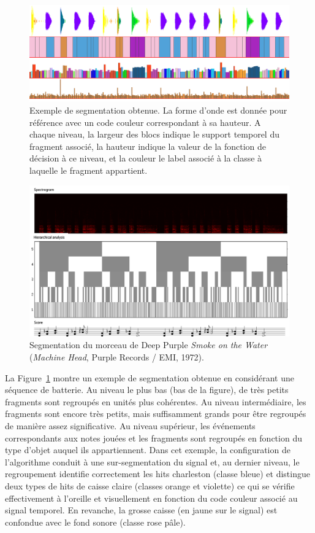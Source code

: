   \begin{figure}[t]
          \includegraphics[width=1.2\textwidth]{figures/alc_sample}
         \caption{Exemple de segmentation obtenue. La forme d'onde est donnée pour référence avec un code couleur correspondant à sa hauteur. A chaque niveau, la largeur des blocs indique le support temporel du fragment associé, la hauteur indique la valeur de la fonction de décision à ce niveau, et la couleur le label associé à la classe à laquelle le fragment appartient.}  \label{fig:alcéchantillon}
  \end{figure}

  \begin{figure}[t]
          \includegraphics[width=1.2\textwidth]{figures/smoke.png}
         \caption{Segmentation du morceau de Deep Purple \emph{Smoke on the Water} (\emph{Machine Head}, Purple Records / EMI, 1972).}  \label{fig:smoke}
  \end{figure}

La Figure~\ref{fig:alcéchantillon} montre un exemple de segmentation obtenue en considérant une séquence de batterie. Au niveau le plus bas (bas de la figure), de très petits fragments sont regroupés en unités plus cohérentes. Au niveau intermédiaire, les fragments sont encore très petits, mais suffisamment grands pour être regroupés de manière assez significative. Au niveau supérieur, les événements correspondants aux notes jouées et les fragments sont regroupés en fonction du type d'objet auquel ils appartiennent. Dans cet exemple, la configuration de l'algorithme conduit à une sur-segmentation du signal et, au dernier niveau, le regroupement identifie correctement les hits charleston (classe bleue) et distingue deux types de hits de caisse claire (classes orange et violette) ce qui se vérifie effectivement à l'oreille et visuellement en fonction du code couleur associé au signal temporel. En revanche, la grosse caisse (en jaune sur le signal) est confondue avec le fond sonore (classe rose pâle).

